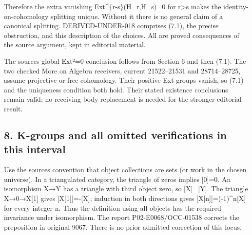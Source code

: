 Therefore the extra vanishing Ext\textasciicircum{}\{r-s\}(H\_\allowbreak{}r,\allowbreak{}H\_\allowbreak{}s)\allowbreak{}\allowbreak{}=0 for r\textgreater s makes the identity-on-cohomology splitting unique. Without it there is no general claim of a canonical splitting. DERIVED-UNDER-018 comprises (7.1)\allowbreak{},\allowbreak{} the precise obstruction,\allowbreak{} and this description of the choices. All are proved consequences of the source argument,\allowbreak{} kept in editorial material.

The source\textquotesingle s global Ext²\allowbreak{}=0 conclusion follows from Section 6 and then (7.1)\allowbreak{}. The two checked More on Algebra receivers,\allowbreak{} current 21522–\allowbreak{}21531 and 28714–\allowbreak{}28725,\allowbreak{} assume projective or free cohomology. Their positive Ext groups vanish,\allowbreak{} so (7.1)\allowbreak{} and the uniqueness condition both hold. Their stated existence conclusions remain valid; no receiving body replacement is needed for the stronger editorial result.

\subsection{8. K-groups and all omitted verifications in this interval}\label{proofs-8774-9196-k-groups-and-all-omitted-verifications-in-this-interval}

Use the source\textquotesingle s convention that object collections are sets (or work in the chosen universe)\allowbreak{}. In a triangulated category,\allowbreak{} the triangle of zeros implies [0]\allowbreak{}\allowbreak{}=0. An isomorphism X\allowbreak{}→Y has a triangle with third object zero,\allowbreak{} so [X]\allowbreak{}\allowbreak{}=[Y]\allowbreak{}. The triangle X\allowbreak{}→0\allowbreak{}→X[1]\allowbreak{} gives [X[1]\allowbreak{}]\allowbreak{}\allowbreak{}=-[X]\allowbreak{}; induction in both directions gives [X[n]\allowbreak{}]\allowbreak{}\allowbreak{}=(-1)\allowbreak{}\textasciicircum{}n[X]\allowbreak{} for every integer n. Thus the definition using all objects has the required invariance under isomorphism. The report P02-E0068/\allowbreak{}OCC-01538 corrects the preposition in original 9067. There is no prior admitted correction of this locus.

